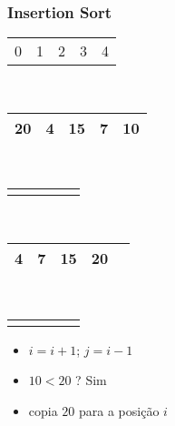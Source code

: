 \documentclass{beamer}
\begin{document}
\begin{frame}
    \frametitle{Insertion Sort}
    \begin{center}
        \begin{table}
            \begin{tabular}{p{0.25cm} p{0.25cm} p{0.25cm} p{0.25cm} p{0.25cm}}
                0 & 1 & 2 & 3 & 4
            \end{tabular} \\
            \begin{tabular}{| p{0.25cm} | p{0.25cm} | p{0.25cm} | p{0.25cm} | p{0.25cm} |}
                \hline
                20 & 4 & 15 & 7 & 10 \\ \hline
            \end{tabular} \\
            \begin{tabular}{p{0.25cm} p{0.25cm} p{0.25cm} p{0.25cm} p{0.25cm}}
                & & & & \color{green}{$\uparrow$}
            \end{tabular} \\
            \begin{tabular}{| p{0.25cm} | p{0.25cm} | p{0.25cm} | p{0.25cm} | p{0.25cm} |}
                \hline
                4 & 7 & 15 & 20 & \\ \hline
            \end{tabular} \\
            \begin{tabular}{p{0.25cm} p{0.25cm} p{0.25cm} p{0.25cm} p{0.25cm}}
                & & & \color{red}{$\uparrow$}  & \color{blue}{$\uparrow$}
            \end{tabular}
        \end{table}
	\end{center}
    \color{green}{$ordenando = 10$}
    \begin{itemize}[<+->]
        \item $i = i + 1$; $j = i - 1$
        \item $10 < 20$ ? Sim
        \item copia $20$ para a posição $i$
    \end{itemize}
\end{frame}
\end{document}
